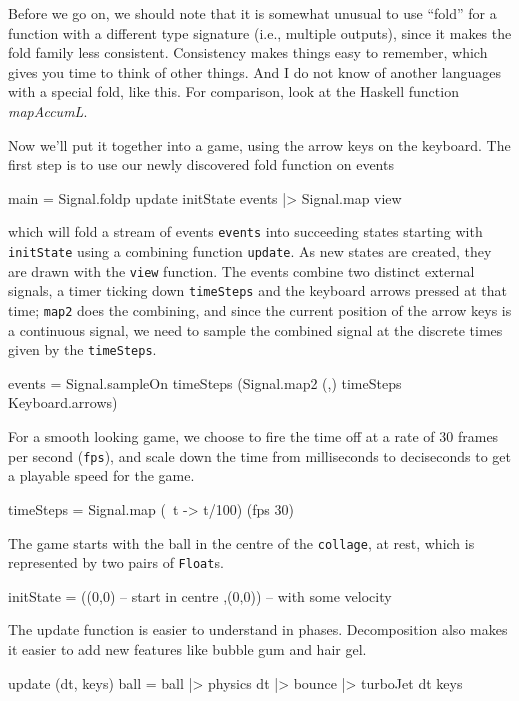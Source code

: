 \documentclass[12pt]{amsbook}
\begin{document}
Before we go on, 
we should note that it is somewhat unusual to use ``fold'' for a function with a different type signature (i.e., multiple outputs), 
since it makes the fold family less consistent.
Consistency makes things easy to remember,
which gives you time to think of other things.
And I do not know of another languages with a special fold, like this.
For comparison, look at the Haskell function \emph{mapAccumL}. 

\medskip

Now we'll put it together into a game, using the arrow keys on the keyboard.
The first step is to use our newly discovered fold function on events
\begin{code}
main = Signal.foldp update initState events
    |> Signal.map view 
\end{code}
which will fold a stream of events \texttt{events} into succeeding states
starting with \texttt{initState} using a combining function \texttt{update}.
As new states are created, they are drawn with the \texttt{view} function.
The events combine two distinct external signals,
a timer ticking down \texttt{timeSteps} and the keyboard arrows pressed at that time;  \texttt{map2} does the combining, and since the current position of the arrow keys is a continuous signal, we need to sample the combined signal at the discrete times given by the \texttt{timeSteps}.
\begin{code}
events = Signal.sampleOn timeSteps (Signal.map2 (,) timeSteps Keyboard.arrows)
\end{code}
For a smooth looking game, we choose to fire the time off at a rate of 30 frames per second (\texttt{fps}), and scale down the time from milliseconds to deciseconds to get a playable speed for the game.  
\begin{code}
timeSteps = Signal.map (\ t -> t/100) (fps 30)
\end{code}
The game starts with the ball in the centre of the \texttt{collage}, at rest,
which is represented by two pairs of \texttt{Float}s.
\begin{code}
initState = ((0,0)    -- start in centre
            ,(0,0))   -- with some velocity
\end{code}
The update function is easier to understand in phases.
Decomposition also makes it easier to add new features like
bubble gum and hair gel.
\begin{code}
update (dt, keys) ball = ball |> physics dt
                              |> bounce
                              |> turboJet dt keys
\end{code}
\end{document}
